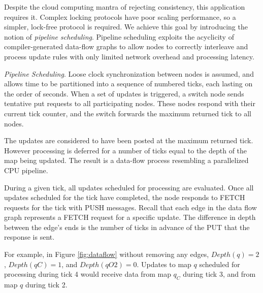 Despite the cloud computing mantra of rejecting consistency, this application requires it.  Complex locking protocols have poor scaling performance, so a simpler, lock-free protocol is required.  We achieve this goal by introducing the notion of \textit{pipeline scheduling}.  Pipeline scheduling exploits the acyclicity of compiler-generated data-flow graphs to allow nodes to correctly interleave and process update rules with only limited network overhead and processing latency.


{\em Pipeline Scheduling}.
Loose clock synchronization between nodes is assumed, and allows time to be partitioned into a sequence of numbered ticks, each lasting on the order of seconds.  When a set of updates is triggered, a switch node sends tentative put requests to all participating nodes.  These nodes respond with their current tick counter, and the switch forwards the maximum returned tick to all nodes.

The updates are considered to have been posted at the maximum returned tick.  However processing is deferred for a number of ticks equal to the depth of the map being updated.  The result is a data-flow process resembling a parallelized CPU pipeline.

During a given tick, all updates scheduled for processing are evaluated.  Once all updates scheduled for the tick have completed, the node responds to FETCH requests for the tick with PUSH messages.  Recall that each edge in the data flow graph represents a FETCH request for a specific update.  The difference in depth between the edge's ends is the number of ticks in advance of the PUT that the response is sent.  

For example, in Figure \ref{fig:dataflow} without removing any edges,
$Depth(q) = 2$, $Depth(qC) = 1$, and $Depth(qO2) = 0$.  Updates to map $q$ scheduled for processing during tick 4 would receive data from map $q_C$ during tick 3, and from map $q$ during tick 2.

